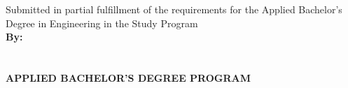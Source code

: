 \begin{titlepage}
    \begin{center}

        \begin{doublespace}
            \textbf{\MakeUppercase{\large{\reporttype}}}\\[0.5cm]\textbf{\MakeUppercase{\normalsize{\titleen}}}\\[3cm]
            
        \end{doublespace}
      
        Submitted in partial fulfillment of the requirements for the Applied Bachelor's Degree in Engineering in the Study Program {\studyprogram} {\department} {\faculty} {\university}\\[3cm]
        

        \textbf{\normalsize {By:}} \\
        \textbf{\normalsize \MakeUppercase{\underline{\authorname}}} \\
        \textbf{\normalsize \MakeUppercase{{\studentid}}} \\[5cm]


        \textbf{\normalsize \MakeUppercase{Applied Bachelor's Degree Program\\ \studyprogram}}\\
        \textbf{\small \MakeUppercase{\department}}\\
        \textbf{\normalsize \MakeUppercase{\faculty}}\\
        \textbf{\normalsize \MakeUppercase{\university}}\\
        \textbf{\normalsize \the\year{}}\\
    \end{center}
\end{titlepage}
